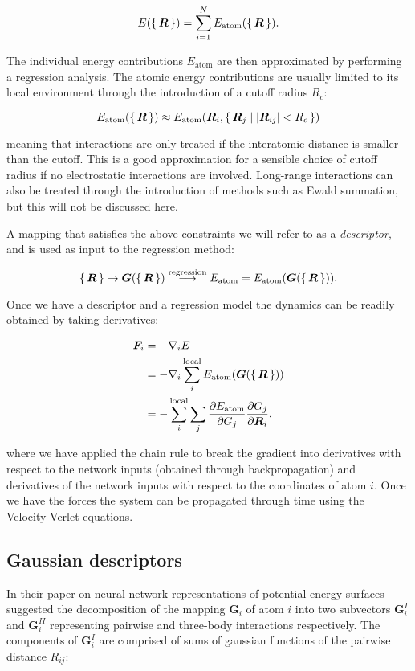 $$ E(\set{\bm{R}}) = \sum_{i=1}^N E_{\text{atom}}(\set{\bm{R}}) . $$

The individual energy contributions $E_{\text{atom}}$
are then approximated by performing a regression analysis.
The atomic energy contributions are usually limited to its
local environment through the introduction of a cutoff radius $R_c$:

$$ E_{\text{atom}} (\set{\bm{R}}) \approx
    E_{\text{atom}} (\bm{R}_i, \set{\bm{R}_j | \left| \bm{R}_{ij} \right|
    < R_c}) $$

meaning that interactions are only treated if the interatomic distance
is smaller than the cutoff. This is a good approximation for a sensible
choice of cutoff radius if no electrostatic interactions are involved.
Long-range interactions can also be treated through
the introduction of methods such as Ewald summation, but this will
not be discussed here.
\par
A mapping that satisfies the above constraints we will refer to
as a \textit{descriptor}, and is used as input to the regression method:

$$ \set{\bm{R}} \rightarrow \bm{G}(\set{\bm{R}}) \overset{\text{regression}}
    {\longrightarrow} E_{\text{atom}} =
    E_{\text{atom}}(\bm{G}(\set{\bm{R}})). $$

Once we have a descriptor and a regression model the dynamics
can be readily obtained by taking derivatives:

\begin{equation}
\begin{split}
    \bm{F}_i &= -\nabla_i E \\
    &= -\nabla_i \sum_i^{\text{local}}
    E_{\text{atom}}(\bm{G}(\set{\bm{R}})) \\
    &= -\sum_i^{\text{local}} \sum_j \frac{\partial E_{\text{atom}}}
    {\partial G_j} \frac{\partial G_j}{\partial \bm{R}_i} ,
\end{split}
\end{equation}

where we have applied the chain rule to break the gradient
into derivatives with respect to the network inputs (obtained through
backpropagation) and derivatives of the network inputs with
respect to the coordinates of atom $i$.
Once we have the forces the system can be propagated through time
using the Velocity-Verlet equations.

\subsection{Gaussian descriptors}
In their paper on neural-network representations of
potential energy surfaces \parencite[Behler, J\"{o}rg and
Parrinello, Michele]{behler2007generalized}
suggested the decomposition of the mapping $\bm{G}_i$ of atom $i$
into two subvectors $\bm{G}_i^I$ and $\bm{G}_i^{II}$ representing
pairwise and three-body interactions respectively.
The components of $\bm{G}_i^I$ are comprised of
sums of gaussian functions of the pairwise distance $R_{ij}$:

